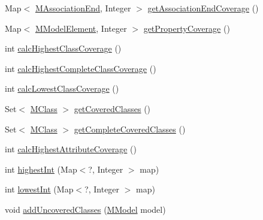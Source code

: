 \begin{DoxyCompactItemize}
\item 
Map$<$ \hyperlink{classorg_1_1tzi_1_1use_1_1uml_1_1mm_1_1_m_association_end}{M\-Association\-End}, Integer $>$ \hyperlink{classorg_1_1tzi_1_1use_1_1analysis_1_1coverage_1_1_coverage_data_aa820121e4cee2fd19b2606d60915d7f4}{get\-Association\-End\-Coverage} ()
\item 
Map$<$ \hyperlink{interfaceorg_1_1tzi_1_1use_1_1uml_1_1mm_1_1_m_model_element}{M\-Model\-Element}, Integer $>$ \hyperlink{classorg_1_1tzi_1_1use_1_1analysis_1_1coverage_1_1_coverage_data_a3df25bb4ac7e44e5b4317c07b37ba78f}{get\-Property\-Coverage} ()
\item 
int \hyperlink{classorg_1_1tzi_1_1use_1_1analysis_1_1coverage_1_1_coverage_data_a99eb5fce934ab4ac91fae1fb3378ef0c}{calc\-Highest\-Class\-Coverage} ()
\item 
int \hyperlink{classorg_1_1tzi_1_1use_1_1analysis_1_1coverage_1_1_coverage_data_a6dc0e175d55bc6972c8c9386864f5f88}{calc\-Highest\-Complete\-Class\-Coverage} ()
\item 
int \hyperlink{classorg_1_1tzi_1_1use_1_1analysis_1_1coverage_1_1_coverage_data_a8447464d6b3387f12d22a3194cfd5321}{calc\-Lowest\-Class\-Coverage} ()
\item 
Set$<$ \hyperlink{interfaceorg_1_1tzi_1_1use_1_1uml_1_1mm_1_1_m_class}{M\-Class} $>$ \hyperlink{classorg_1_1tzi_1_1use_1_1analysis_1_1coverage_1_1_coverage_data_a6f6509fad30486cbb0cc54d826d6e2c5}{get\-Covered\-Classes} ()
\item 
Set$<$ \hyperlink{interfaceorg_1_1tzi_1_1use_1_1uml_1_1mm_1_1_m_class}{M\-Class} $>$ \hyperlink{classorg_1_1tzi_1_1use_1_1analysis_1_1coverage_1_1_coverage_data_a20e5b58cfa14785d82f9891680b46ffe}{get\-Complete\-Covered\-Classes} ()
\item 
int \hyperlink{classorg_1_1tzi_1_1use_1_1analysis_1_1coverage_1_1_coverage_data_a48afa37eb3a806555250ccf78cd60a84}{calc\-Highest\-Attribute\-Coverage} ()
\item 
int \hyperlink{classorg_1_1tzi_1_1use_1_1analysis_1_1coverage_1_1_coverage_data_ae71e610eec84f7741d60b75011674cf0}{highest\-Int} (Map$<$?, Integer $>$ map)
\item 
int \hyperlink{classorg_1_1tzi_1_1use_1_1analysis_1_1coverage_1_1_coverage_data_ad881998879814146a9d408e8cc29d974}{lowest\-Int} (Map$<$?, Integer $>$ map)
\item 
void \hyperlink{classorg_1_1tzi_1_1use_1_1analysis_1_1coverage_1_1_coverage_data_a5c69b8bb656847efce6e3b41b23750d1}{add\-Uncovered\-Classes} (\hyperlink{classorg_1_1tzi_1_1use_1_1uml_1_1mm_1_1_m_model}{M\-Model} model)
\end{DoxyCompactItemize}
